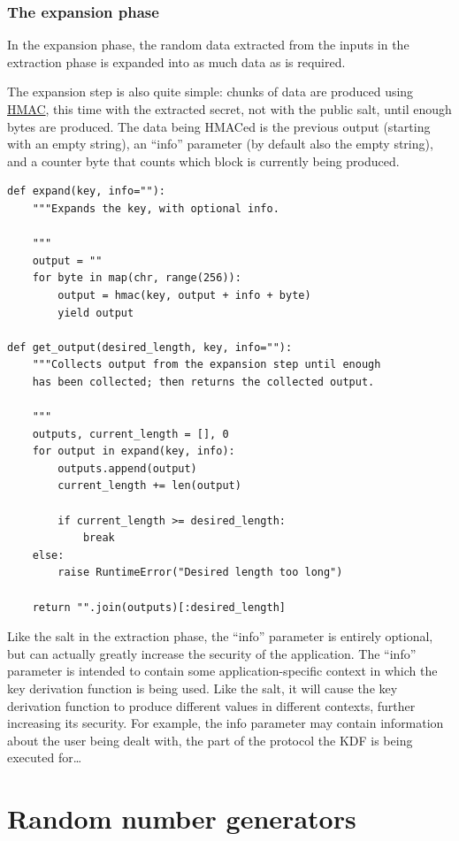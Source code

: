 \documentclass[11pt,ebook,table,dvipsnames]{memoir}
\begin{document}
\subsection{The expansion phase}
\label{sec-2-9-6-2}

In the expansion phase, the random data extracted from the inputs in
the extraction phase is expanded into as much data as is required.

The expansion step is also quite simple: chunks of data are produced
using \hyperref[HMAC]{HMAC}, this time with the extracted secret, not with the public
salt, until enough bytes are produced. The data being HMACed is the
previous output (starting with an empty string), an \enquote{info} parameter
(by default also the empty string), and a counter byte that counts
which block is currently being produced.

\begin{verbatim}
def expand(key, info=""):
    """Expands the key, with optional info.

    """
    output = ""
    for byte in map(chr, range(256)):
        output = hmac(key, output + info + byte)
        yield output

def get_output(desired_length, key, info=""):
    """Collects output from the expansion step until enough
    has been collected; then returns the collected output.

    """
    outputs, current_length = [], 0
    for output in expand(key, info):
        outputs.append(output)
        current_length += len(output)

        if current_length >= desired_length:
            break
    else:
        raise RuntimeError("Desired length too long")

    return "".join(outputs)[:desired_length]
\end{verbatim}

Like the salt in the extraction phase, the \enquote{info} parameter is
entirely optional, but can actually greatly increase the security of
the application. The \enquote{info} parameter is intended to contain some
application-specific context in which the key derivation function is
being used. Like the salt, it will cause the key derivation function
to produce different values in different contexts, further increasing
its security. For example, the info parameter may contain information
about the user being dealt with, the part of the protocol the KDF is
being executed for\ldots{} \cite{rfc5869}
\chapter{Random number generators}
\label{sec-2-10}
\end{document}

